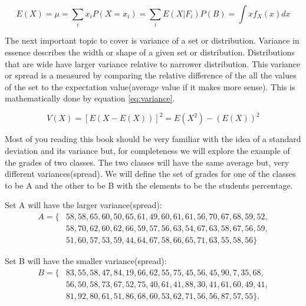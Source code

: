 \documentclass[11pt,a4paper]{book}
\begin{document}
		\begin{equation}
			\label{eq:expectation value}
			E(X)=\mu=\sum_i{x_i P(X=x_i)}=\sum_i{E(X|F_i)P(B)} =\int{xf_X(x)dx}
		\end{equation}
		
		The next important topic to cover is variance of a set or distribution. Variance in essence describes the width or shape of a given set or distribution. Distributions that are wide have larger variance relative to narrower distribution. This variance or spread is a measured by comparing the relative difference of the all the values of the set to the expectation value(average value if it makes more sense). This is mathematically done by equation \autoref{eq:variance}.
		
		\begin{equation}
			\label{eq:variance}
			V(X)=\left[E(X-E(X))\right]^2 = E(X^2)-\left(E(X)\right)^2
		\end{equation}
		
		Most of you reading this book should be very familiar with the idea of a standard deviation and its variance but, for completeness we will explore the example of the grades of two classes. The two classes will have the same average but, very different variances(spread). We will define the set of grades for one of the classes to be A and the other to be B with the elements to be the students percentage.
		
		\noindent
		Set A will have the larger variance(spread): 
		\begin{equation}
		\label{eq:set A class with large variance}
		\begin{split}
			A = \{&58, 58, 65, 60, 50, 65, 61, 49, 60, 61, 61, 56, 70, 67, 68, 59, 52, \\
			& 58, 70, 62, 60, 62, 66, 59, 57, 56, 63, 54, 67, 63, 58, 67, 56, 59, \\
			& 51, 60, 57, 53, 59, 44, 64, 67, 58, 66, 65, 71, 63, 55, 58, 56\}
		\end{split}
		\end{equation}
		
		\noindent
		Set B will have the smaller variance(spread): 
		\begin{equation}
		\label{eq:set B class with smaller variance}
		\begin{split}
			B = \{&83, 55, 58, 47, 84, 19, 66, 62, 55, 75, 45, 56, 45, 90,  7, 35, 68, \\
			& 56, 50, 58, 73, 67, 52, 75, 40, 61, 41, 88, 30, 41, 61, 60, 49, 41,\\
			& 81, 92, 80, 61, 51, 86, 68, 60, 53, 62, 71, 56, 56, 87, 57, 55\}.
		\end{split}
		\end{equation}
		
\end{document}
